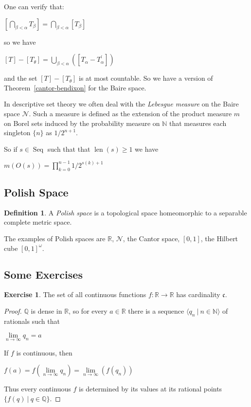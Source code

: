 \documentclass[8pt]{article}
\theoremstyle{definition}
\newtheorem{definition}{Definition}[section]
\theoremstyle{definition}
\theoremstyle{definition}
\theoremstyle{definition}
\theoremstyle{definition}
\theoremstyle{definition}
\theoremstyle{definition}
\theoremstyle{definition}
\theoremstyle{definition}
\theoremstyle{definition}
\theoremstyle{definition}
\theoremstyle{definition}
\theoremstyle{definition}
\newtheorem{exercise}{Exercise}[section]
\theoremstyle{definition}
\theoremstyle{question}
\begin{document}
One can verify that:
\begin{center}
  $[\bigcap \limits_{\beta < \alpha} T_{\beta}] = \bigcap \limits_{\beta < \alpha} [T_{\beta}]$
\end{center}
so we have
\begin{center}
  $[T] - [T_{\theta}] = \bigcup \limits_{\beta < \alpha} ([T_{\alpha} - T^{'}_{\alpha}])$
\end{center}
and the set $[T] - [T_{\theta}]$ is at most countable. So we have a version of Theorem~\ref{cantor-bendixon} for the Baire space.

\vspace{\baselineskip}

In descriptive set theory we often deal with the \emph{Lebesgue measure} on the Baire space $\mathcal{N}$.
Such a measure is defined as the extension of the product measure $m$ on Borel sets induced by
the probability measure on $\mathbb{N}$ that measures each singleton $\{ n \}$ as $1/2^{n + 1}$.

So if $s \in \operatorname{Seq}$ such that that $\operatorname{len}(s) \geq 1$ we have
\begin{center}
  $m(O(s)) = \prod \limits_{k = 0}^{n - 1} 1/2^{s(k) + 1}$
\end{center}

\subsection{Polish Space}

\begin{definition}
  A \emph{Polish space} is a topological space homeomorphic to a separable complete metric space.
\end{definition}

The examples of Polish spaces are $\mathbb{R}$, $\mathcal{N}$, the Cantor space, $[0, 1]$,
the Hilbert cube $[0, 1]^{\omega}$.

\subsection{Some Exercises}

\begin{exercise}
  The set of all continuous functions $f : \mathbb{R} \to \mathbb{R}$ has cardinality $\mathfrak{c}$.
\end{exercise}

\begin{proof}
  $\mathbb{Q}$ is dense in $\mathbb{R}$, so for every $a \in \mathbb{R}$ there is a sequence
  $\langle q_n \: | \: n \in \mathbb{N} \rangle$ of rationals such that
  \begin{center}
    $\lim \limits_{n \to \infty} q_n = a$
  \end{center}
  If $f$ is continuous, then
  \begin{center}
  $f(a) = f(\lim \limits_{n \to \infty} q_n) = \lim \limits_{n \to \infty} (f(q_n))$
  \end{center}
  Thus every continuous $f$ is determined by its values at its rational points $\{ f(q) \: | \: q \in \mathbb{Q}\}$.
\end{proof}
\end{document}
